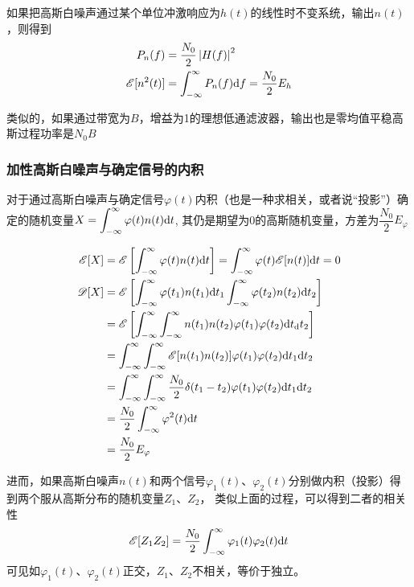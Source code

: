     如果把高斯白噪声通过某个单位冲激响应为$h(t)$的线性时不变系统，输出$n(t)$，则得到
    \begin{align}
        P_n(f)&=\frac{N_0}{2}\left\vert H(f) \right\vert^2\\
        \mathscr{E}[n^2(t)]&=\int_{-\infty}^{\infty}P_n(f)\text{\upshape d} f=\frac{N_0}{2}E_h
    \end{align}

    类似的，如果通过带宽为$B$，增益为1的理想低通滤波器，输出也是零均值平稳高斯过程功率是$N_0B$

    \subsubsection{加性高斯白噪声与确定信号的内积}
    对于通过高斯白噪声与确定信号$\varphi(t)$内积（也是一种求相关，或者说“投影”）确定的随机变量$X=\displaystyle\int_{-\infty}^{\infty}\varphi(t)n(t)\text{\upshape d} t$,
    其仍是期望为0的高斯随机变量，方差为$\dfrac{N_0}{2}E_\varphi$
    
    \Proof
    \begin{equation*}
        \begin{split}
            \mathscr{E}[X] &=\mathscr{E}\left[\int_{-\infty}^{\infty}\varphi(t)n(t)\text{\upshape d} t\right]=\int_{-\infty}^{\infty}\varphi(t)\mathscr{E}[n(t)]\text{\upshape d} t=0\\
            \mathscr{D}[X] &=\mathscr{E}\left[\int_{-\infty}^{\infty}\varphi(t_1)n(t_1)\text{\upshape d} t_1\int_{-\infty}^{\infty}\varphi(t_2)n(t_2)\text{\upshape d} t_2\right]\\
                           &=\mathscr{E}\left[\int_{-\infty}^{\infty}\int_{-\infty}^{\infty}n(t_1)n(t_2)\varphi(t_1)\varphi(t_2)\text{\upshape d} t_{\text{\upshape d}} t_2\right]\\
                           &=\int_{-\infty}^{\infty}\int_{-\infty}^{\infty}\mathscr{E}[n(t_1)n(t_2)]\varphi(t_1)\varphi(t_2)\text{\upshape d} t_1\text{\upshape d} t_2\\
                           &=\int_{-\infty}^{\infty}\int_{-\infty}^{\infty}\frac{N_0}{2}\delta(t_1-t_2)\varphi(t_1)\varphi(t_2)\text{\upshape d} t_1\text{\upshape d} t_2\\
                           &=\frac{N_0}{2}\int_{-\infty}^{\infty}\varphi^2(t)\text{\upshape d} t\\
                           &=\frac{N_0}{2}E_\varphi
        \end{split}
    \end{equation*}

    进而，如果高斯白噪声$n(t)$和两个信号$\varphi_1(t)$、$\varphi_2(t)$分别做内积（投影）得到两个服从高斯分布的随机变量$Z_1$、$Z_2$，
    类似上面的过程，可以得到二者的相关性
    \begin{equation}
        \mathscr{E}[Z_1Z_2]=\frac{N_0}{2}\int_{-\infty}^{\infty}\varphi_1(t)\varphi_2(t)\text{\upshape d} t
    \end{equation}
    可见如$\varphi_1(t)$、$\varphi_2(t)$正交，$Z_1$、$Z_2$不相关，等价于独立。

